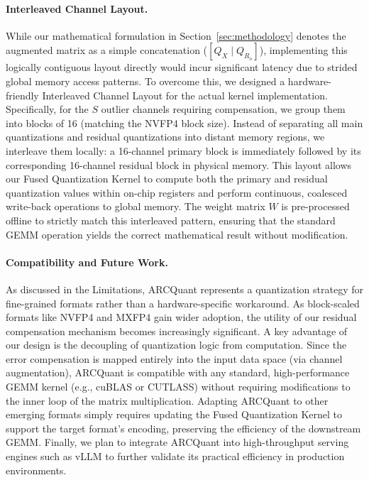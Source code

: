 \documentclass[11pt]{article}
\begin{document}
\paragraph{Interleaved Channel Layout.}
While our mathematical formulation in Section~\ref{sec:methodology} denotes the augmented matrix as a simple concatenation ($[Q_X \mid Q_{R_{\text{o}}}]$), implementing this logically contiguous layout directly would incur significant latency due to strided global memory access patterns.
To overcome this, we designed a hardware-friendly Interleaved Channel Layout for the actual kernel implementation.
Specifically, for the $S$ outlier channels requiring compensation, we group them into blocks of 16 (matching the NVFP4 block size).
Instead of separating all main quantizations and residual quantizations into distant memory regions, we interleave them locally: a 16-channel primary block is immediately followed by its corresponding 16-channel residual block in physical memory.
This layout allows our Fused Quantization Kernel to compute both the primary and residual quantization values within on-chip registers and perform continuous, coalesced write-back operations to global memory.
The weight matrix $W$ is pre-processed offline to strictly match this interleaved pattern, ensuring that the standard GEMM operation yields the correct mathematical result without modification.

\paragraph{Compatibility and Future Work.}
As discussed in the Limitations, ARCQuant represents a quantization strategy for fine-grained formats rather than a hardware-specific workaround.
As block-scaled formats like NVFP4 and MXFP4 gain wider adoption, the utility of our residual compensation mechanism becomes increasingly significant.
A key advantage of our design is the decoupling of quantization logic from computation.
Since the error compensation is mapped entirely into the input data space (via channel augmentation), ARCQuant is compatible with any standard, high-performance GEMM kernel (e.g., cuBLAS or CUTLASS) without requiring modifications to the inner loop of the matrix multiplication.
Adapting ARCQuant to other emerging formats simply requires updating the Fused Quantization Kernel to support the target format's encoding, preserving the efficiency of the downstream GEMM.
Finally, we plan to integrate ARCQuant into high-throughput serving engines such as vLLM to further validate its practical efficiency in production environments.
\end{document}
